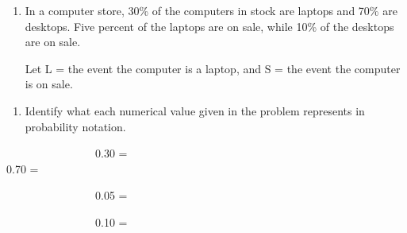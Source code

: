 \documentclass[
]{report}
\providecommand{\tightlist}{%
  \setlength{\itemsep}{0pt}\setlength{\parskip}{0pt}}
\begin{document}
\newpage

\begin{enumerate}
\def\labelenumi{\arabic{enumi}.}
\setcounter{enumi}{9}
\item
  In a computer store, 30\% of the computers in stock are laptops and 70\% are desktops. Five percent of the laptops are on sale, while 10\% of the desktops are on sale.
  \vspace{1mm}

  Let L = the event the computer is a laptop, and S = the event the computer is on sale.
  \vspace{0.1in}
\end{enumerate}

\begin{enumerate}
\def\labelenumi{\alph{enumi}.}
\tightlist
\item
  Identify what each numerical value given in the problem represents in probability notation.
  \vspace{.1in}
\end{enumerate}

~~~~~~~~~~~~~~~~0.30 = \vspace{.1in}\\
\hspace*{0.333em}\hspace*{0.333em}\hspace*{0.333em}\hspace*{0.333em}\hspace*{0.333em}\hspace*{0.333em}\hspace*{0.333em}\hspace*{0.333em}\hspace*{0.333em}\hspace*{0.333em}\hspace*{0.333em}\hspace*{0.333em}\hspace*{0.333em}\hspace*{0.333em}\hspace*{0.333em}\hspace*{0.333em}0.70 =

\vspace{.1in}

~~~~~~~~~~~~~~~~0.05 =

\vspace{.1in}

~~~~~~~~~~~~~~~~0.10 =

\vspace{.1in}
\end{document}
